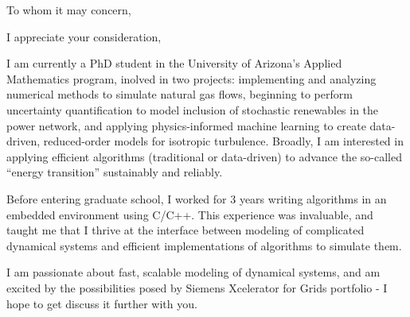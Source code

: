 \documentclass[11pt,a4paper,sans]{moderncv}        %
\begin{document}
\date{\today}
\opening{To whom it may concern,}
\closing{I appreciate your consideration,}
\makelettertitle

I am currently a PhD student in the University of Arizona's Applied Mathematics program, inolved in two projects: implementing and analyzing numerical methods to simulate natural gas flows, beginning to perform uncertainty quantification to model inclusion of stochastic renewables in the power network, and applying physics-informed machine learning to create data-driven, reduced-order models for isotropic turbulence. Broadly, I am interested in applying efficient algorithms (traditional or data-driven) to advance the so-called ``energy transition'' sustainably and reliably.

Before entering graduate school, I worked for 3 years writing algorithms in an embedded environment using C/C++. This experience was invaluable, and taught me that I thrive at the interface between modeling of complicated dynamical systems and efficient implementations of algorithms to simulate them.

I am passionate about fast, scalable modeling of dynamical systems, and am excited by the possibilities posed by Siemens Xcelerator for Grids portfolio - I hope to get discuss it further with you.

\vspace{1in}
\makeletterclosing
\end{document}
